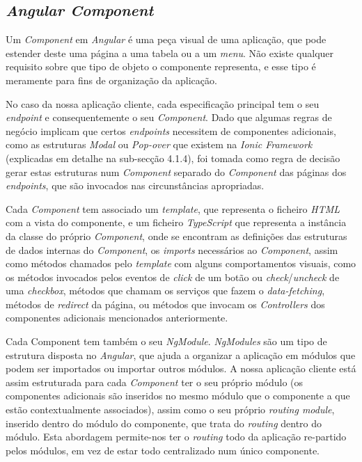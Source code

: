 \subsection{\textit{Angular Component}}\label{sub411}

Um \emph{Component} em \emph{Angular} é uma peça visual de uma aplicação, que pode estender deste uma página a uma tabela ou a um \textit{menu}. Não existe qualquer requisito sobre que tipo de objeto o componente representa, e esse tipo é meramente para fins de organização da aplicação. 

No caso da nossa aplicação cliente, cada especificação principal tem o seu \emph{endpoint} e consequentemente o seu \emph{Component}. Dado que algumas regras de negócio implicam que certos \emph{endpoints} necessitem de componentes adicionais, como as estruturas \emph{Modal} ou \emph{Pop-over} que existem na \emph{Ionic Framework} (explicadas em detalhe na sub-secção 4.1.4), foi tomada como regra de decisão gerar estas estruturas num \emph{Component} separado do \emph{Component} das páginas dos \emph{endpoints}, que são invocados nas circunstâncias apropriadas.

Cada \textit{Component} tem associado um \textit{template}, que representa o ficheiro \textit{HTML} com a vista do componente, e um ficheiro \textit{TypeScript} que representa a instância da classe do próprio \textit{Component}, onde se encontram as definições das estruturas de dados internas do \textit{Component}, os \textit{imports} necessários ao \textit{Component}, assim como métodos chamados pelo \textit{template} com alguns comportamentos visuais, como os métodos invocados pelos eventos de \textit{click} de um botão ou \textit{check}/\textit{uncheck} de uma \textit{checkbox}, métodos que chamam os serviços que fazem o \textit{data-fetching}, métodos de \textit{redirect} da página, ou métodos que invocam os \textit{Controllers} dos componentes adicionais mencionados anteriormente.

Cada Component tem também o seu \textit{NgModule}. \textit{NgModules} são um tipo de estrutura disposta no \textit{Angular}, que ajuda a organizar a aplicação em módulos que podem ser importados ou importar outros módulos. A nossa aplicação cliente está assim estruturada para cada \textit{Component} ter o seu próprio módulo (os componentes adicionais são inseridos no mesmo módulo que o componente a que estão contextualmente associados), assim como o seu próprio \textit{routing module}, inserido dentro do módulo do componente, que trata do \textit{routing} dentro do módulo. Esta abordagem permite-nos ter o \textit{routing} todo da aplicação re-partido pelos módulos, em vez de estar todo centralizado num único componente.

